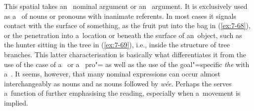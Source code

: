  This spatial  takes an~ nominal argument or an~  argument. It is exclusively used as a~ of nouns or pronouns with inanimate referents. In most cases it signals contact with the surface of something, as the fruit put into the bag in (\ref{ex:7-68}), or the penetration into a~location or beneath the surface of an~object, such as the hunter sitting in the tree in (\ref{ex:7-69}), i.e., inside the structure of tree branches. This latter characterisation is basically what differentiates it from the  use of the  case of a~ or a~ pro"= as well as the use of the goal"=specific  \textit{the} with a~. It seems, however, that many  nominal expressions can occur almost interchangeably as  nouns and as nouns followed by \textit{wée}. Perhaps the  serves a~function of further emphasising the  reading, especially when a~movement is implied.


